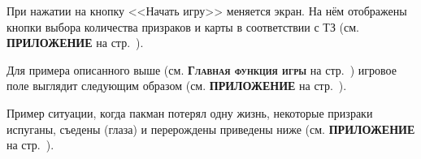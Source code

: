 При нажатии на кнопку <<Начать игру>> меняется экран. На нём отображены кнопки выбора количества призраков и карты в соответствии с ТЗ (см. \textbf{\textsc{ПРИЛОЖЕНИЕ}} на стр.~\pageref{fig4}).

Для примера описанного выше (см. \textbf{\textsc{Главная функция игры}} на стр.~\pageref{subsec:ch02/sec01/sub07}) игровое поле выглядит следующим образом (см. \textbf{\textsc{ПРИЛОЖЕНИЕ}} на стр.~\pageref{fig5}).

Пример ситуации, когда пакман потерял одну жизнь, некоторые призраки испуганы, съедены (глаза) и перерождены приведены ниже (см. \textbf{\textsc{ПРИЛОЖЕНИЕ}} на стр.~\pageref{fig6}).